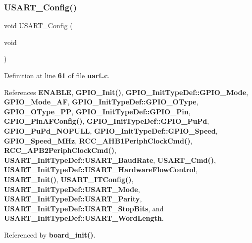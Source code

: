 \subsubsection{U\+S\+A\+R\+T\+\_\+\+Config()}
{\footnotesize\ttfamily void U\+S\+A\+R\+T\+\_\+\+Config (\begin{DoxyParamCaption}\item[{void}]{ }\end{DoxyParamCaption})}



Definition at line \textbf{ 61} of file \textbf{ uart.\+c}.



References \textbf{ E\+N\+A\+B\+LE}, \textbf{ G\+P\+I\+O\+\_\+\+Init()}, \textbf{ G\+P\+I\+O\+\_\+\+Init\+Type\+Def\+::\+G\+P\+I\+O\+\_\+\+Mode}, \textbf{ G\+P\+I\+O\+\_\+\+Mode\+\_\+\+AF}, \textbf{ G\+P\+I\+O\+\_\+\+Init\+Type\+Def\+::\+G\+P\+I\+O\+\_\+\+O\+Type}, \textbf{ G\+P\+I\+O\+\_\+\+O\+Type\+\_\+\+PP}, \textbf{ G\+P\+I\+O\+\_\+\+Init\+Type\+Def\+::\+G\+P\+I\+O\+\_\+\+Pin}, \textbf{ G\+P\+I\+O\+\_\+\+Pin\+A\+F\+Config()}, \textbf{ G\+P\+I\+O\+\_\+\+Init\+Type\+Def\+::\+G\+P\+I\+O\+\_\+\+Pu\+Pd}, \textbf{ G\+P\+I\+O\+\_\+\+Pu\+Pd\+\_\+\+N\+O\+P\+U\+LL}, \textbf{ G\+P\+I\+O\+\_\+\+Init\+Type\+Def\+::\+G\+P\+I\+O\+\_\+\+Speed}, \textbf{ G\+P\+I\+O\+\_\+\+Speed\+\_\+M\+Hz}, \textbf{ R\+C\+C\+\_\+\+A\+H\+B1\+Periph\+Clock\+Cmd()}, \textbf{ R\+C\+C\+\_\+\+A\+P\+B2\+Periph\+Clock\+Cmd()}, \textbf{ U\+S\+A\+R\+T\+\_\+\+Init\+Type\+Def\+::\+U\+S\+A\+R\+T\+\_\+\+Baud\+Rate}, \textbf{ U\+S\+A\+R\+T\+\_\+\+Cmd()}, \textbf{ U\+S\+A\+R\+T\+\_\+\+Init\+Type\+Def\+::\+U\+S\+A\+R\+T\+\_\+\+Hardware\+Flow\+Control}, \textbf{ U\+S\+A\+R\+T\+\_\+\+Init()}, \textbf{ U\+S\+A\+R\+T\+\_\+\+I\+T\+Config()}, \textbf{ U\+S\+A\+R\+T\+\_\+\+Init\+Type\+Def\+::\+U\+S\+A\+R\+T\+\_\+\+Mode}, \textbf{ U\+S\+A\+R\+T\+\_\+\+Init\+Type\+Def\+::\+U\+S\+A\+R\+T\+\_\+\+Parity}, \textbf{ U\+S\+A\+R\+T\+\_\+\+Init\+Type\+Def\+::\+U\+S\+A\+R\+T\+\_\+\+Stop\+Bits}, and \textbf{ U\+S\+A\+R\+T\+\_\+\+Init\+Type\+Def\+::\+U\+S\+A\+R\+T\+\_\+\+Word\+Length}.



Referenced by \textbf{ board\+\_\+init()}.


